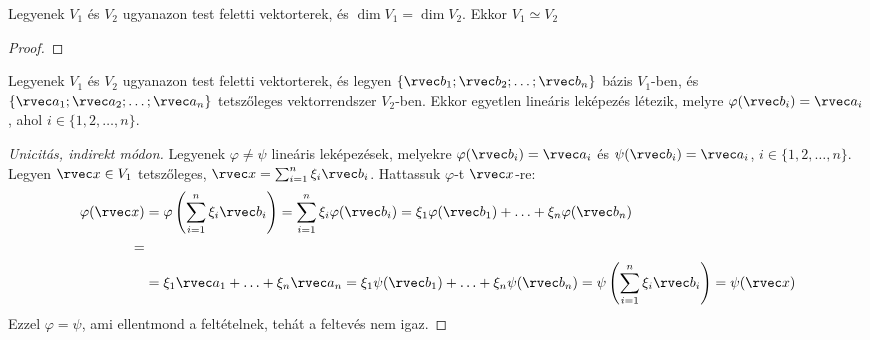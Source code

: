 \begin{statement}
  Legyenek $V_1$ és $V_2$ ugyanazon test feletti vektorterek, és
  $\dim V_1 = \dim V_2$. Ekkor $V_1 \simeq V_2$

  \begin{proof}
    \vspace{7em}
  \end{proof}
\end{statement}

\begin{theorem}
  Legyenek $V_1$ és $V_2$ ugyanazon test feletti vektorterek, és legyen
  $\{ \rvec b_1; \rvec b_2; \ldots; \rvec b_n \}$ bázis $V_1$-ben, és
  $\{ \rvec a_1; \rvec a_2; \ldots; \rvec a_n \}$ tetszőleges vektorrendszer
  $V_2$-ben. Ekkor egyetlen lineáris leképezés létezik, melyre
  $\varphi(\rvec b_i) = \rvec a_i$, ahol $i \in \{1, 2, \ldots, n\}$.

  \begin{proof}[Unicitás, indirekt módon]
    Legyenek $\varphi \neq \psi$ lineáris leképezések, melyekre
    $\varphi(\rvec b_i) = \rvec a_i$ és $\psi(\rvec b_i) = \rvec a_i$,
    $i \in \{1, 2, \ldots, n\}$. Legyen $\rvec x \in V_1$ tetszőleges,
    $\rvec x = \sum_{i=1}^{n} \xi_i \rvec b_i$. Hattassuk $\varphi$-t
    $\rvec x$-re:
    \begin{align*}
      \varphi(\rvec x)
       & = \varphi\left(
      \sum_{i = 1}^{n} \xi_i \rvec b_i
      \right)
      = \sum_{i = 1}^{n} \xi_i \varphi(\rvec b_i)
      = \xi_1 \varphi(\rvec b_1) + \ldots + \xi_n \varphi(\rvec b_n) \\
      =
      \\
       & = \xi_1 \rvec a_1 + \ldots + \xi_n \rvec a_n
      = \xi_1 \psi(\rvec b_1) + \ldots + \xi_n \psi(\rvec b_n)
      = \psi\left(
      \sum_{i = 1}^{n} \xi_i \rvec b_i
      \right)
      = \psi(\rvec x)
    \end{align*}
    Ezzel $\varphi = \psi$, ami ellentmond a feltételnek, tehát a feltevés nem
    igaz.
  \end{proof}


\end{theorem}
